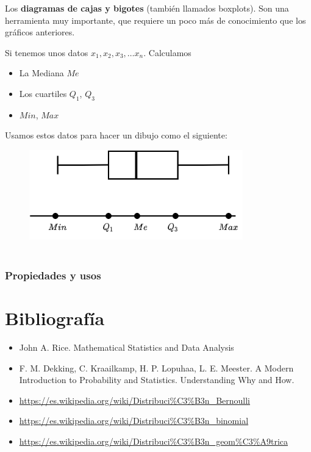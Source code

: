 \documentclass[
]{article}
\providecommand{\tightlist}{%
  \setlength{\itemsep}{0pt}\setlength{\parskip}{0pt}}
\begin{document}
Los \textbf{diagramas de cajas y bigotes} (también llamados boxplots).
Son una herramienta muy importante, que requiere un poco más de
conocimiento que los gráficos anteriores.

Si tenemos unos datos \(x_1, x_2, x_3,\ldots x_n\). Calculamos

\begin{itemize}
\tightlist
\item
  La Mediana \(Me\)
\item
  Los cuartiles \(Q_1\), \(Q_3\)
\item
  \(Min\), \(Max\)
\end{itemize}

Usamos estos datos para hacer un dibujo como el siguiente:

\begin{figure}
\centering
\includegraphics[width=3.64583in,height=\textheight]{img/boxplot.png}
\caption{~}
\end{figure}

\hypertarget{propiedades-y-usos-2}{%
\subsubsection{Propiedades y usos}\label{propiedades-y-usos-2}}

\hypertarget{bibliografuxeda}{%
\section{Bibliografía}\label{bibliografuxeda}}

\begin{itemize}
\tightlist
\item
  John A. Rice. Mathematical Statistics and Data Analysis
\item
  F. M. Dekking, C. Kraailkamp, H. P. Lopuhaa, L. E. Meester. A Modern
  Introduction to Probability and Statistics. Understanding Why and How.
\item
  \url{https://es.wikipedia.org/wiki/Distribuci\%C3\%B3n_Bernoulli}
\item
  \url{https://es.wikipedia.org/wiki/Distribuci\%C3\%B3n_binomial}
\item
  \url{https://es.wikipedia.org/wiki/Distribuci\%C3\%B3n_geom\%C3\%A9trica}
\end{itemize}
\end{document}
